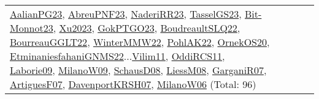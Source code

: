 {\begin{longtable}{p{3cm}r>{\raggedright\arraybackslash}p{6cm}>{\raggedright\arraybackslash}p{6cm}>{\raggedright\arraybackslash}p{8cm}}
\hyperref[detail:AalianPG23]{AalianPG23}, \hyperref[detail:AbreuPNF23]{AbreuPNF23}, \hyperref[detail:NaderiRR23]{NaderiRR23}, \hyperref[detail:TasselGS23]{TasselGS23}, \hyperref[detail:Bit-Monnot23]{Bit-Monnot23}, \hyperref[detail:Xu2023]{Xu2023}, \hyperref[detail:GokPTGO23]{GokPTGO23}, \hyperref[detail:BoudreaultSLQ22]{BoudreaultSLQ22}, \hyperref[detail:BourreauGGLT22]{BourreauGGLT22}, \hyperref[detail:WinterMMW22]{WinterMMW22}, \hyperref[detail:PohlAK22]{PohlAK22}, \hyperref[detail:OrnekOS20]{OrnekOS20}, \hyperref[detail:EtminaniesfahaniGNMS22]{EtminaniesfahaniGNMS22}...\hyperref[detail:Vilim11]{Vilim11}, \hyperref[detail:OddiRCS11]{OddiRCS11}, \hyperref[detail:Laborie09]{Laborie09}, \hyperref[detail:MilanoW09]{MilanoW09}, \hyperref[detail:SchausD08]{SchausD08}, \hyperref[detail:LiessM08]{LiessM08}, \hyperref[detail:GarganiR07]{GarganiR07}, \hyperref[detail:ArtiguesF07]{ArtiguesF07}, \hyperref[detail:DavenportKRSH07]{DavenportKRSH07}, \hyperref[detail:MilanoW06]{MilanoW06} (Total: 96)\\

\end{longtable}}
